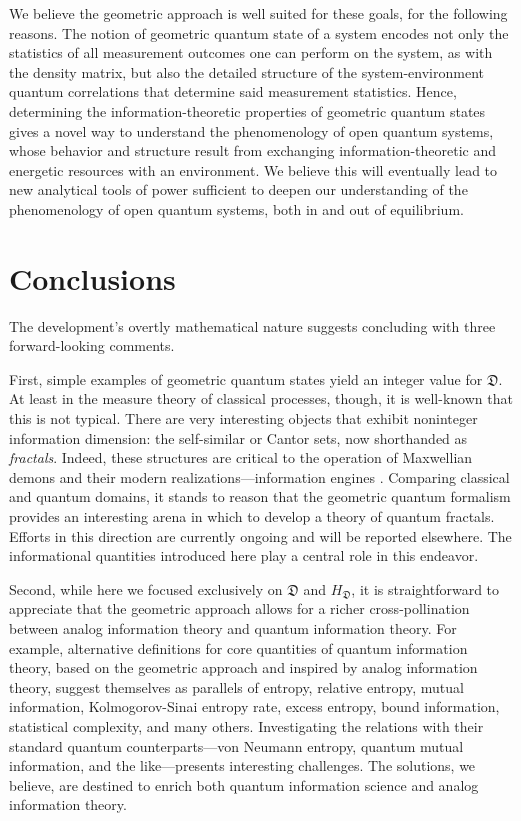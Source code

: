 \documentclass[draft,nofootinbib,pre,twocolumn,showkeys,superscriptaddress,preprintnumbers,floatfix]{revtex4-1}
\newcommand{\1}{\mathbbm{1}}
\begin{document}
We believe the geometric approach is well suited for these goals, for the
following reasons. The notion of geometric quantum state of a system
\cite{Anza20a} encodes not only the statistics of all measurement outcomes one
can perform on the system, as with the density matrix, but also the detailed
structure of the system-environment quantum correlations that determine said
measurement statistics. Hence, determining the information-theoretic properties
of geometric quantum states gives a novel way to understand the phenomenology
of open quantum systems, whose behavior and structure result from exchanging
information-theoretic and energetic resources with an environment. We believe
this will eventually lead to new analytical tools of power sufficient to
deepen our understanding of the phenomenology of open quantum systems, both in
and out of equilibrium.

\section{Conclusions}
\label{sec:Conclusions}

The development's overtly mathematical nature suggests concluding with three
forward-looking comments.

First, simple examples of geometric quantum states yield an integer value for
$\mathfrak{D}$. At least in the measure theory of classical processes, though,
it is well-known that this is not typical. There are very interesting objects
that exhibit noninteger information dimension: the self-similar or Cantor sets,
now shorthanded as \emph{fractals}. Indeed, these structures are critical to
the operation of Maxwellian demons \cite{Boyd14b} and their modern
realizations---information engines \cite{Boyd15a}. Comparing classical and quantum
domains, it stands to reason that the geometric quantum formalism provides an
interesting arena in which to develop a theory of quantum fractals. Efforts in
this direction are currently ongoing and will be reported elsewhere. The
informational quantities introduced here play a central role in this endeavor.

Second, while here we focused exclusively on $\mathfrak{D}$ and
$H_{\mathfrak{D}}$, it is straightforward to appreciate that the geometric
approach allows for a richer cross-pollination between analog information
theory and quantum information theory. For example, alternative definitions for
core quantities of quantum information theory, based on the geometric approach
and inspired by analog information theory, suggest themselves as parallels of
entropy, relative entropy, mutual information, Kolmogorov-Sinai entropy rate,
excess entropy, bound information, statistical complexity, and many others.
Investigating the relations with their standard quantum counterparts---von
Neumann entropy, quantum mutual information, and the like---presents
interesting challenges. The solutions, we believe, are destined to enrich both
quantum information science and analog information theory.
\end{document}
